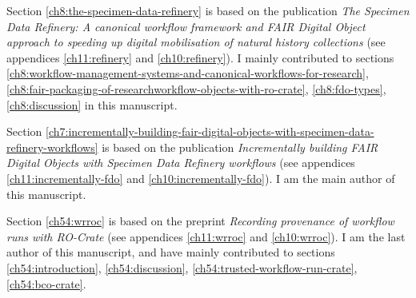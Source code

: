 Section \ref{ch8:the-specimen-data-refinery} is based on the publication \emph{The Specimen Data Refinery: A
canonical workflow framework and FAIR Digital Object approach to speeding up digital mobilisation of natural history collections} \cite{Hardisty 2022} (see appendices \ref{ch11:refinery} and \ref{ch10:refinery}). I mainly contributed to sections \ref{ch8:workflow-management-systems-and-canonical-workflows-for-research}, \ref{ch8:fair-packaging-of-researchworkflow-objects-with-ro-crate}, \ref{ch8:fdo-types}, \ref{ch8:discussion} in this manuscript.

Section \ref{ch7:incrementally-building-fair-digital-objects-with-specimen-data-refinery-workflows} is based on the publication \emph{Incrementally building FAIR Digital Objects with Specimen Data
Refinery workflows} \cite{Woolland 2022} (see appendices \ref{ch11:incrementally-fdo} and \ref{ch10:incrementally-fdo}). I am the main author of this manuscript.

Section \ref{ch54:wrroc} is based on the preprint \emph{
Recording provenance of workflow runs with RO-Crate} \cite{Leo 2023b} (see appendices \ref{ch11:wrroc} and \ref{ch10:wrroc}). I am the last author of this manuscript, and have mainly contributed to sections \ref{ch54:introduction}, \ref{ch54:discussion}, \ref{ch54:trusted-workflow-run-crate}, \ref{ch54:bco-crate}.
